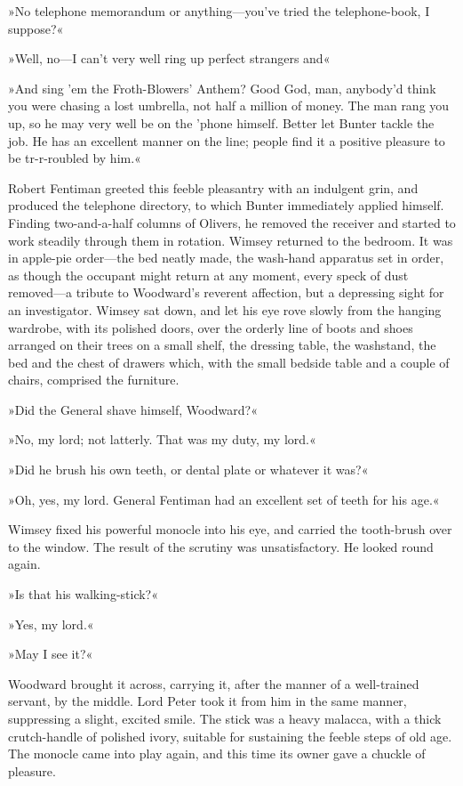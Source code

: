 »No telephone memorandum or anything—you've tried the telephone-book, I suppose?«

»Well, no—I can't very well ring up perfect strangers and\longdash«

»And sing 'em the Froth-Blowers' Anthem? Good God, man, anybody'd think you were chasing a lost umbrella, not half a million of money. The man rang you up, so he may very well be on the 'phone himself. Better let Bunter tackle the job. He has an excellent manner on the line; people find it a positive pleasure to be tr-r-roubled by him.«

Robert Fentiman greeted this feeble pleasantry with an indulgent grin, and produced the telephone directory, to which Bunter immediately applied himself. Finding two-and-a-half columns of Olivers, he removed the receiver and started to work steadily through them in rotation. Wimsey returned to the bedroom. It was in apple-pie order—the bed neatly made, the wash-hand apparatus set in order, as though the occupant might return at any moment, every speck of dust removed—a tribute to Woodward's reverent affection, but a depressing sight for an investigator. Wimsey sat down, and let his eye rove slowly from the hanging wardrobe, with its polished doors, over the orderly line of boots and shoes arranged on their trees on a small shelf, the dressing table, the washstand, the bed and the chest of drawers which, with the small bedside table and a couple of chairs, comprised the furniture.

»Did the General shave himself, Woodward?«

»No, my lord; not latterly. That was my duty, my lord.«

»Did he brush his own teeth, or dental plate or whatever it was?«

»Oh, yes, my lord. General Fentiman had an excellent set of teeth for his age.«

Wimsey fixed his powerful monocle into his eye, and carried the tooth-brush over to the window. The result of the scrutiny was unsatisfactory. He looked round again.

»Is that his walking-stick?«

»Yes, my lord.«

»May I see it?«

Woodward brought it across, carrying it, after the manner of a well-trained servant, by the middle. Lord Peter took it from him in the same manner, suppressing a slight, excited smile. The stick was a heavy malacca, with a thick crutch-handle of polished ivory, suitable for sustaining the feeble steps of old age. The monocle came into play again, and this time its owner gave a chuckle of pleasure.

